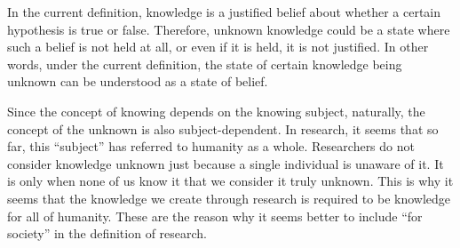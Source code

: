 In the current definition, knowledge is a justified belief about whether a certain hypothesis is true or false. Therefore, unknown knowledge could be a state where such a belief is not held at all, or even if it is held, it is not justified. In other words, under the current definition, the state of certain knowledge being unknown can be understood as a state of belief.

Since the concept of knowing depends on the knowing subject, naturally, the concept of the unknown is also subject-dependent. In research, it seems that so far, this ``subject'' has referred to humanity as a whole. Researchers do not consider knowledge unknown just because a single individual is unaware of it. It is only when none of us know it that we consider it truly unknown. This is why it seems that the knowledge we create through research is required to be knowledge for all of humanity. These are the reason why it seems better to include ``for society'' in the definition of research.








